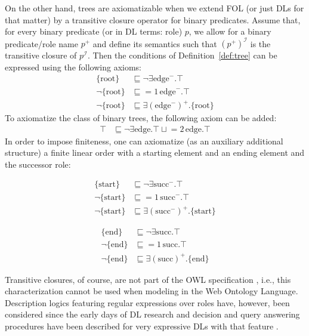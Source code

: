 On the other hand, trees are axiomatizable when we extend FOL (or just DLs for that matter) by a transitive closure operator for binary predicates. Assume that, for every binary predicate (or in DL terms: role) $p$, we allow for a binary predicate/role name $p^+$ and define its semantics such that $(p^+)^\mathcal{I}$ is the transitive closure of $p^\mathcal{I}$. Then the conditions of Definition~\ref{def:tree} can be expressed using the following axioms:
\begin{align}
\{\text{root}\} &\sqsubseteq  \neg \exists \text{edge}^-.\top\\
\neg \{\text{root}\} &\sqsubseteq  {=}1\, \text{edge}^-.\top \\
\neg \{\text{root}\} &\sqsubseteq \exists (\text{edge}^-)^+.\{\text{root}\}
\end{align}
To axiomatize the class of binary trees, the following axiom can be added: 
\begin{align}
\top &\sqsubseteq  \neg \exists \text{edge}.\top \sqcup {{=}2} \,\text{edge}.\top
\end{align}
In order to impose finiteness, one can axiomatize (as an auxiliary additional structure) a finite linear order with a starting element and an ending element and the successor role:

\noindent
\begin{minipage}{0.49\textwidth}
\begin{align}
\{\text{start}\} &\sqsubseteq  \neg \exists \text{succ}^-.\top\\
\neg \{\text{start}\} &\sqsubseteq  {=}1\, \text{succ}^-.\top \\
\neg \{\text{start}\} &\sqsubseteq \exists (\text{succ}^-)^+.\{\text{start}\}
\end{align}
\end{minipage}
\hfill
\begin{minipage}{0.49\textwidth}
\begin{align}
\{\text{end}\} &\sqsubseteq  \neg \exists \text{succ}.\top\\
\neg \{\text{end}\} &\sqsubseteq  {=}1\, \text{succ}.\top \\
\neg \{\text{end}\} &\sqsubseteq \exists (\text{succ})^+.\{\text{end}\}
\end{align}
\end{minipage}

\bigskip

Transitive closures, of course, are not part of the OWL specification \cite{owl2-primer}, i.e., this characterization cannot be used when modeling in the Web Ontology Language. Description logics featuring regular expressions over roles have, however, been considered since the early days of DL research \cite{DBLP:conf/ijcai/Baader91} and decision and query answering procedures have been described for very expressive DLs with that feature \cite{DBLP:conf/ijcai/CalvaneseEO09}.
